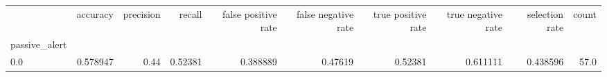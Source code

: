 \begin{tabular}{lrrrrrrrrr}
\toprule
{} &  accuracy &  precision &   recall &  false positive rate &  false negative rate &  true positive rate &  true negative rate &  selection rate &  count \\
passive\_alert &           &            &          &                      &                      &                     &                     &                 &        \\
\midrule
0.0           &  0.578947 &       0.44 &  0.52381 &             0.388889 &              0.47619 &             0.52381 &            0.611111 &        0.438596 &   57.0 \\
\bottomrule
\end{tabular}
